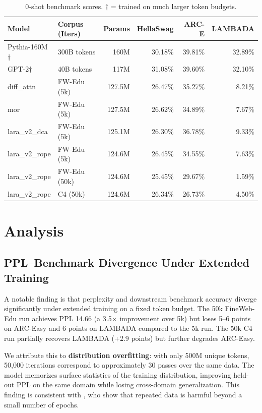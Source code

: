 \documentclass{article}
\begin{document}
\begin{table}[h]
\centering
\caption{0-shot benchmark scores. $\dagger$ = trained on much larger token budgets.}
\label{tab:benchmarks}
\begin{tabular}{llrrrr}
\toprule
Model & Corpus (Iters) & Params & HellaSwag & ARC-E & LAMBADA \\
\midrule
Pythia-160M$\dagger$ & 300B tokens & 160M & 30.18\% & 39.81\% & 32.89\% \\
GPT-2$\dagger$       & 40B tokens  & 117M & 31.08\% & 39.60\% & 32.10\% \\
\midrule
diff\_attn   & FW-Edu (5k)  & 127.5M & 26.47\% & 35.27\% & 8.21\% \\
mor          & FW-Edu (5k)  & 127.5M & 26.62\% & 34.89\% & 7.67\% \\
lara\_v2\_dca & FW-Edu (5k) & 125.1M & 26.30\% & 36.78\% & 9.33\% \\
lara\_v2\_rope & FW-Edu (5k) & 124.6M & 26.45\% & 34.55\% & 7.63\% \\
lara\_v2\_rope & FW-Edu (50k) & 124.6M & 25.45\% & 29.67\% & 1.59\% \\
lara\_v2\_rope & C4 (50k) & 124.6M & 26.34\% & 26.73\% & 4.50\% \\
\bottomrule
\end{tabular}
\end{table}

\section{Analysis}

\subsection{PPL–Benchmark Divergence Under Extended Training}

A notable finding is that perplexity and downstream benchmark accuracy diverge significantly under extended training on a fixed token budget. The 50k FineWeb-Edu run achieves PPL 14.66 (a 3.5$\times$ improvement over 5k) but loses 5–6 points on ARC-Easy and 6 points on LAMBADA compared to the 5k run. The 50k C4 run partially recovers LAMBADA (+2.9 points) but further degrades ARC-Easy.

We attribute this to \textbf{distribution overfitting}: with only 500M unique tokens, 50{,}000 iterations correspond to approximately 30 passes over the same data. The model memorizes surface statistics of the training distribution, improving held-out PPL on the same domain while losing cross-domain generalization. This finding is consistent with \citet{muennighoff2023scaling}, who show that repeated data is harmful beyond a small number of epochs.
\end{document}
